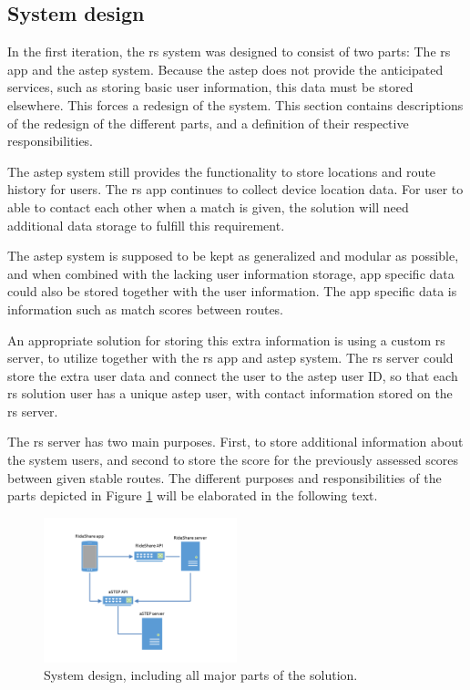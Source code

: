 \subsection{System design}\label{sec:s2systemdesign}
In the first iteration, the \gls{rs} system was designed to consist of two parts: The \gls{rs} app and the \gls{astep} system.
Because the \gls{astep} does not provide the anticipated services, such as storing basic user information, this data must be stored elsewhere.
This forces a redesign of the system.
This section contains descriptions of the redesign of the different parts, and a definition of their respective responsibilities.


The \gls{astep} system still provides the functionality to store locations and route history for users.
The \gls{rs} app continues to collect device location data.  
For user to able to contact each other when a match is given, the solution will need additional data storage to fulfill this requirement.


The \gls{astep} system is supposed to be kept as generalized and modular as possible, and when combined with the lacking user information storage, app specific data could also be stored together with the user information.
The app specific data is information such as match scores between routes.


An appropriate solution for storing this extra information is using a custom \gls{rs} server, to utilize together with the \gls{rs} app and \gls{astep} system.
The \gls{rs} server could store the extra user data and connect the user to the \gls{astep} user ID, so that each \gls{rs} solution user has a unique \gls{astep} user, with contact information stored on the \gls{rs} server.

The \gls{rs} server has two main purposes.
First, to store additional information about the system users, and second to store the score for the previously assessed scores between given stable routes.
The different purposes and responsibilities of the parts depicted in Figure \ref{fig:s2systemdesign} will be elaborated in the following text.
\begin{figure}
	\vspace{-12pt}
	\centering
	\includegraphics[width=0.5\textwidth,trim={4cm 2cm 4cm 2cm},clip]{figures/SystemDesign.png}
	\caption{System design, including all major parts of the solution.}
	\vspace{-12pt}
	\label{fig:s2systemdesign}
\end{figure}

